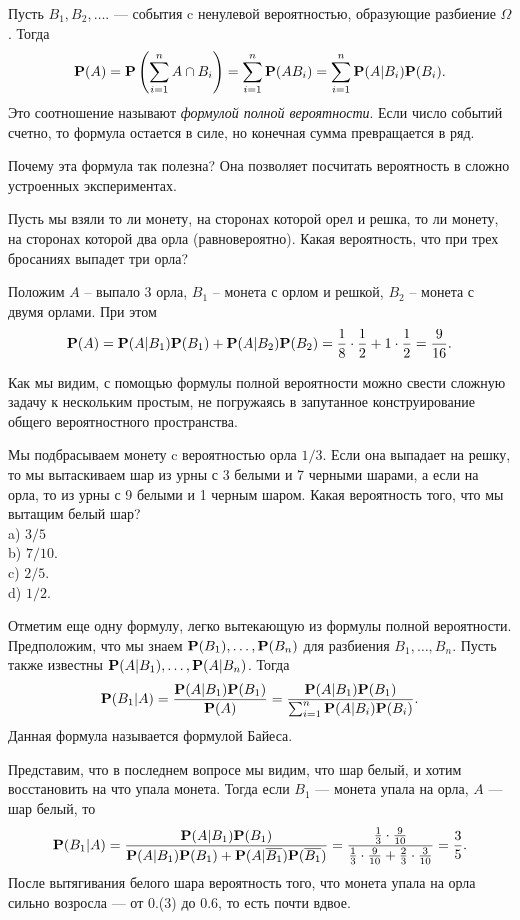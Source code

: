 \documentclass[11 pt,russian]{article}
\begin{document}
Пусть $B_1,B_2,\dotsc.$ --- события c ненулевой вероятностью, образующие разбиение $\Omega$. Тогда
$$
{\bf P}(A) = {\bf P}\left(\sum_{i=1}^{n} A\cap B_i\right) =
 \sum_{i=1}^{n} {\bf P}(AB_i) = \sum_{i=1}^{n} {\bf P}(A|B_i){\bf P}(B_i).
$$
Это соотношение называют {\it формулой полной вероятности}. Если число событий счетно, то формула остается в силе, но конечная сумма превращается в ряд.

Почему эта формула так полезна? Она позволяет посчитать вероятность в сложно устроенных экспериментах. 
\begin{Exam}
Пусть мы взяли то ли монету, на сторонах которой орел и решка, то ли монету, на сторонах которой два орла (равновероятно). Какая вероятность, что при трех бросаниях выпадет три орла?

Положим $A$ -- выпало 3 орла, $B_1$ -- монета с орлом и решкой, $B_2$ -- монета с двумя орлами. При этом 
$$
{\bf P}(A) = {\bf P}(A|B_1) {\bf P}(B_1) + {\bf P}(A|B_2) {\bf P}(B_2) = \frac{1}{8} \cdot \frac12 + 1\cdot \frac12 = \frac{9}{16}.
$$ 
\end{Exam}
Как мы видим, с помощью формулы полной вероятности можно свести сложную задачу к нескольким простым, не погружаясь в запутанное конструирование общего вероятностного пространства.
\begin{Que}
Мы подбрасываем монету c вероятностью орла $1/3$. Если она выпадает на решку, то мы вытаскиваем шар из урны с 3 белыми и 7 черными шарами, а если на орла, то из урны с 9 белыми и 1 черным шаром. Какая вероятность того, что мы вытащим белый шар?\\
a) $3/5$\\
b) $7/10$.\\
c) $2/5$.\\
d) $1/2$.
\end{Que}
Отметим еще одну формулу, легко вытекающую из формулы полной вероятности. Предположим, что мы знаем ${\bf P}(B_1),\dotsc,{\bf P}(B_n)$ для разбиения $B_1, \dotsc ,B_n$. Пусть также известны ${\bf P}(A|B_1),\dotsc,{\bf P}(A|B_n)$. Тогда 
$$
{\bf P}(B_1|A) = \frac{{\bf P}(A|B_1) {\bf P}(B_1)}{{\bf P}(A)} = \frac{{\bf P}(A|B_1) {\bf P}(B_1) }{\sum_{i=1}^{n} {\bf P}(A|B_i) {\bf P}(B_i)}.
$$
Данная формула называется формулой Байеса.
\begin{Exam}
Представим, что в последнем вопросе мы видим, что шар белый, и хотим восстановить на что упала монета. Тогда если $B_1$ --- монета упала на орла, $A$ --- шар белый, 
то
$$
{\bf P}(B_1|A) = \frac{{\bf P}(A|B_1) {\bf P}(B_1)}{{\bf P}(A|B_1) {\bf P}(B_1)+{\bf P}(A|\overline{B_1}) {\bf P}(\overline{B_1})} = \frac{\frac13 \cdot \frac{9}{10}}{\frac13 \cdot \frac{9}{10} + \frac23 \cdot \frac{3}{10}} = \frac{3}{5}.
$$
После вытягивания белого шара вероятность того, что монета упала на орла сильно возросла --- от 0.(3) до 0.6, то есть почти вдвое.
\end{Exam}
\end{document}
